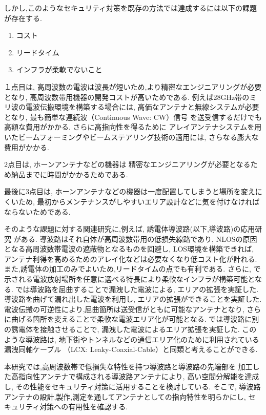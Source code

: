 \documentclass[technicalreport]{ieicej}
\begin{document}
しかし,このようなセキュリティ対策を既存の方法では達成するには以下の課題が存在する.

\begin{enumerate}
  \item コスト
  \item リードタイム
  \item インフラが柔軟でないこと
\end{enumerate}

１点目は,
高周波数の電波は波長が短いため,より精密なエンジニアリングが必要となり,
高周波数帯用機器の開発コストが高いためである.
例えば28GHz帯のミリ波の電波伝搬環境を構築する場合には,
高価なアンテナと無線システムが必要となり,
最も簡単な連続波（Continuous Wave: CW）信号
を送受信するだけでも高額な費用がかかる\cite{zep}.
さらに高指向性を得るために
アレイアンテナシステムを用いたビームフォーミングやビームステアリング技術の適用には,
さらなる膨大な費用がかかる.

2点目は,
ホーンアンテナなどの機器は
精密なエンジニアリングが必要となるため納品までに時間がかかるためである.

最後に3点目は,
ホーンアンテナなどの機器は一度配置してしまうと場所を変えにくいため,
最初からメンテナンスがしやすいエリア設計などに気を付けなければならないためである.

そのような課題に対する関連研究に,例えば,
誘電体導波路(以下,導波路)の応用研究
\cite{bending_antenna} \cite{leaky_wave_antenna_bent_dielectric}
がある.
導波路はそれ自体が高周波数帯用の低損失線路であり,
NLOSの原因となる高周波数帯電波の遮蔽物となるものを回避し,
LOS環境を構築できれば,
アンテナ利得を高めるためのアレイ化などは必要なくなり低コスト化が計れる.
また,誘電体の加工のみでよいため,リードタイムの点でも有利である.
さらに,\cite{bending_antenna}
\cite{leaky_wave_antenna_bent_dielectric} \cite{pinching_antenna}
で示される電波放射場所を任意に選べる特長により柔軟なインフラが構築可能となる.
\cite{bending_antenna}では導波路を屈曲することで漏洩した電波による,
エリアの拡張を実証した.
導波路を曲げて漏れ出した電波を利用し,
エリアの拡張ができることを実証した.
電波伝搬の可逆性により,屈曲箇所は送受信がともに可能なアンテナとなり,
さらに曲げる箇所を変えることで柔軟な電波エリア化が可能となる.
\cite{leaky_wave_antenna_bent_dielectric} \cite{pinching_antenna}
では導波路に別の誘電体を接触させることで,
漏洩した電波によるエリア拡張を実証した.
このような導波路は,
地下街やトンネルなどの通信エリア化のために利用されている漏洩同軸ケーブル
（LCX: Leaky-Coaxial-Cable）と同類と考えることができる.

本研究では,高周波数帯で低損失な特性を持つ導波路と導波路の先端部を
加工した高指向性アンテナで構成される導波路アンテナにより,
高い空間分解能を達成し,
その性能をセキュリティ対策に活用することを検討している.
そこで,
導波路アンテナの設計,製作,測定を通してアンテナとしての指向特性を明らかにし,
セキュリティ対策への有用性を確認する.
\end{document}
